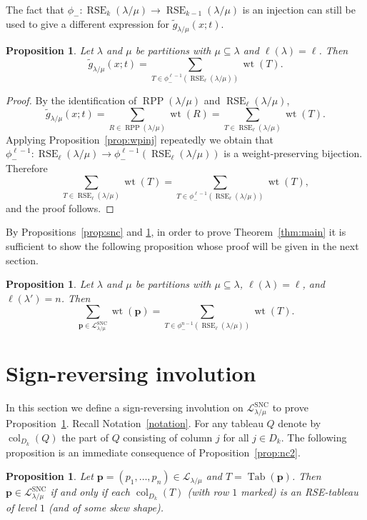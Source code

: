 \documentclass{amsart}
\numberwithin{equation}{section}
\newtheorem{prop}[thm]{Proposition}
\theoremstyle{definition}
\newcommand\Tab{\operatorname{Tab}}
\newcommand\LL{\mathcal{L}_\lm}
\newcommand\lsnc{\LL^{\operatorname{SNC}}}
\newcommand\col{\operatorname{col}}
\newcommand\pu{\phi_-}
\newcommand\RSE{\operatorname{RSE}}
\newcommand\RPP{\operatorname{RPP}}
\newcommand\pp{\mathbf{p}}
\newcommand\lm{{\lambda/\mu}}
\renewcommand\gg{\widetilde{g}}
\newcommand\wt{\operatorname{wt}}
\begin{document}
The fact that $\pu:\RSE_k(\lm)\to \RSE_{k-1}(\lm)$ is an injection can still be
used to give a different expression for $\gg_\lm(x;t)$.

\begin{prop}\label{prop:glm1}
  Let $\lambda$ and $\mu$ be partitions with $\mu\subseteq\lambda$ and
  $\ell(\lambda)=\ell$. Then 
\[
\gg_\lm(x;t)  = \sum_{T\in \pu^{\ell-1}(\RSE_\ell(\lm))}\wt(T).
\]
\end{prop}
\begin{proof}
  By the identification of $\RPP(\lm)$ and $\RSE_\ell(\lm)$,
  \[
\gg_\lm(x;t) = \sum_{R\in \RPP(\lm)}\wt(R)
= \sum_{T\in \RSE_\ell(\lm)}\wt(T).
\]
Applying Proposition~\ref{prop:wpinj} repeatedly we obtain that
$\pu^{\ell-1}:\RSE_\ell(\lm)\to \pu^{\ell-1}(\RSE_\ell(\lm))$ is a weight-preserving
bijection. Therefore
\[
  \sum_{T\in \RSE_\ell(\lm)}\wt(T) =\sum_{T\in \pu^{\ell-1}(\RSE_\ell(\lm))}\wt(T) ,
\]
and the proof follows. 
\end{proof}

By Propositions~\ref{prop:snc} and \ref{prop:glm1}, in order to prove
Theorem~\ref{thm:main} it is sufficient to show the following proposition whose
proof will be given in the next section.

\begin{prop}\label{prop:snc=pu}
  Let $\lambda$ and $\mu$ be partitions with $\mu\subseteq\lambda$, $\ell(\lambda)=
  \ell$, and $\ell(\lambda')=n$. Then
\[
    \sum_{\pp\in \lsnc} \wt(\pp) = \sum_{T\in \pu^{n-1}(\RSE_\ell(\lm))}\wt(T).
  \]
\end{prop}


\section{Sign-reversing involution}
\label{sec:sign-revers-invol}

In this section we define a sign-reversing involution on $\lsnc$ to prove
Proposition~\ref{prop:snc=pu}. Recall Notation~\ref{notation}. For any tableau
$Q$ denote by $\col_{D_k}(Q)$ the part of $Q$ consisting of column $j$ for all
$j\in D_k$. The following proposition is an immediate consequence of
Proposition~\ref{prop:nc2}.

\begin{prop}\label{prop:snc RSE1}
  Let $\pp=(p_1,\dots,p_n)\in\LL$ and $T=\Tab(\pp)$. Then $\pp\in\lsnc$ if and
  only if each $\col_{D_k}(T)$ (with row $1$ marked) is an RSE-tableau of level
  $1$ (and of some skew shape).
\end{prop}
\end{document}
